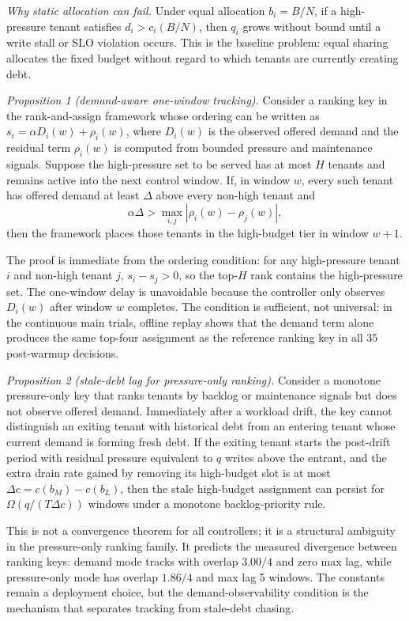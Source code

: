 \emph{Why static allocation can fail.}
Under equal allocation \(b_i=B/N\), if a high-pressure tenant satisfies
\(d_i>c_i(B/N)\), then \(q_i\) grows without bound until a write stall or
SLO violation occurs. This is the baseline problem: equal sharing allocates the
fixed budget without regard to which tenants are currently creating debt.

\emph{Proposition 1 (demand-aware one-window tracking).}
Consider a ranking key in the rank-and-assign framework whose ordering can
be written as \(s_i=\alpha D_i(w)+\rho_i(w)\), where \(D_i(w)\) is the
observed offered demand and the residual term \(\rho_i(w)\) is computed from
bounded pressure and maintenance signals. Suppose the high-pressure set to be
served has at most \(H\) tenants and remains active into the next control
window. If, in window \(w\), every such tenant has offered demand at least
\(\Delta\) above every non-high tenant and
\[
\alpha\Delta > \max_{i,j}|\rho_i(w)-\rho_j(w)|,
\]
then the framework places those tenants in the high-budget tier in window
\(w+1\).

The proof is immediate from the ordering condition: for any high-pressure
tenant \(i\) and non-high tenant \(j\), \(s_i-s_j>0\), so the top-\(H\) rank
contains the high-pressure set. The one-window delay is unavoidable because the
controller only observes \(D_i(w)\) after window \(w\) completes. The condition
is sufficient, not universal: in the continuous main trials, offline replay
shows that the demand term alone produces the same top-four assignment as the
reference ranking key in all 35 post-warmup decisions.

\emph{Proposition 2 (stale-debt lag for pressure-only ranking).}
Consider a monotone pressure-only key that ranks tenants by backlog or
maintenance signals but does not observe offered demand. Immediately after a
workload drift, the key cannot distinguish an exiting tenant with
historical debt from an entering tenant whose current demand is forming fresh
debt. If the exiting tenant starts the post-drift period with residual pressure
equivalent to \(q\) writes above the entrant, and the extra drain rate gained
by removing its high-budget slot is at most \(\Delta c=c(b_M)-c(b_L)\), then
the stale high-budget assignment can persist for
\(\Omega(q/(T\Delta c))\) windows under a monotone backlog-priority rule.

This is not a convergence theorem for all controllers; it is a structural
ambiguity in the pressure-only ranking family. It predicts the measured divergence
between ranking keys: demand mode tracks with overlap \(3.00/4\) and zero
max lag, while pressure-only mode has overlap \(1.86/4\) and max lag 5
windows. The constants remain a deployment choice, but the
demand-observability condition is the mechanism that separates tracking from
stale-debt chasing.
